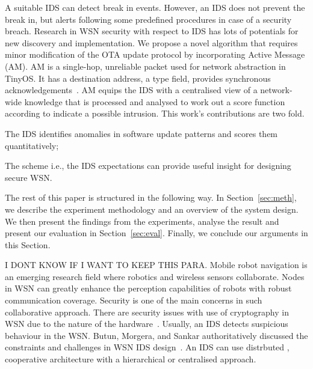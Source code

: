 \documentclass[conference,final]{IEEEtran}
\begin{document}
A suitable IDS can detect  break in events. 
However, an IDS does not prevent the break in, but alerts following some predefined procedures in case of a security breach.
Research in WSN security with respect to IDS has lots of potentials for new discovery and implementation. 
We propose a novel algorithm that requires minor modification of the OTA update protocol by incorporating Active Message (AM). 
AM is a single-hop, unreliable packet used for network abstraction in TinyOS. 
It has a destination address, a type field, provides synchronous acknowledgements~\cite{tep116}. 
AM equips the IDS with a centralised view of a network-wide knowledge that is processed and analysed to work out a score function according to indicate a possible intrusion.
This work's contributions are two fold.
\begin{inparaenum}
\item  The IDS identifies anomalies in software update patterns and scores them quantitatively;
\item The scheme i.e., the IDS expectations can provide useful insight for designing secure WSN.
\end{inparaenum}

The rest of this paper is structured in the following way. 
In Section~\ref{sec:meth}, we describe the experiment methodology and an overview of the system  design. 
We then present the findings from the experiments, analyse the result and present our evaluation in Section~\ref{sec:eval}.  
Finally, we conclude our arguments in this Section.




I DONT KNOW IF I WANT TO KEEP THIS PARA.
Mobile robot navigation is an emerging research field where robotics and wireless sensors collaborate.
Nodes in WSN can greatly enhance the perception capabilities of robots with robust communication coverage.
Security is one of the main concerns in such collaborative approach.
There are security issues with use of cryptography in WSN due to the nature of the hardware~\cite{1710}.
Usually, an IDS detects suspicious behaviour in the WSN.
Butun, Morgera, and Sankar authoritatively discussed the constraints and challenges in WSN IDS design~\cite{6517052}.
An IDS can use distrbuted , cooperative architecture with a hierarchical or centralised approach.
\end{document}
